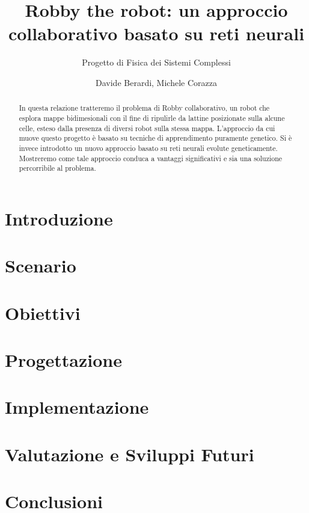 \documentclass[a4paper,10pt,abstracton]{scrartcl}
\begin{document}
\title{Robby the robot: un approccio collaborativo basato su reti neurali}
\subtitle{Progetto di Fisica dei Sistemi Complessi}

\author{Davide Berardi, Michele Corazza}

\maketitle

\begin{abstract}
	In questa relazione tratteremo il problema di Robby collaborativo,
	un robot che esplora mappe bidimesionali con il fine di ripulirle da
	lattine posizionate sulla alcune celle, esteso dalla presenza di diversi
	robot sulla stessa mappa.
	L'approccio da cui muove questo progetto è basato su tecniche di
	apprendimento puramente genetico.
	Si è invece introdotto un nuovo approccio basato su reti neurali evolute
	geneticamente. Mostreremo come tale approccio conduca a vantaggi
	significativi e sia una soluzione percorribile al problema.
\end{abstract}

\section{Introduzione}


\section{Scenario}




\section {Obiettivi}


\section{Progettazione}



\section{Implementazione}



\section{Valutazione e Sviluppi Futuri}



\section{Conclusioni}





\end{document}
